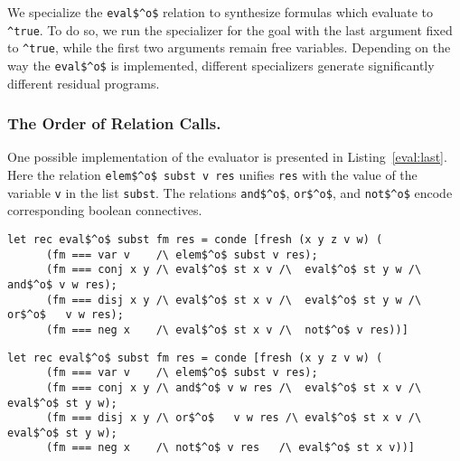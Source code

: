 We specialize the \lstinline{eval$^o$} relation to synthesize formulas which evaluate to \lstinline{^true}.
To do so, we run the specializer for the goal with the last argument fixed to \lstinline{^true}, while the first two arguments remain free variables.
Depending on the way the \lstinline{eval$^o$} is implemented, different specializers generate significantly different residual programs.

\subsubsection{The Order of Relation Calls.}

One possible implementation of the evaluator is presented in Listing~\ref{eval:last}.
Here the relation \lstinline{elem$^o$ subst v res} unifies \lstinline{res} with the value of the variable \lstinline{v} in the list \lstinline{subst}.
The relations \lstinline{and$^o$}, \lstinline{or$^o$}, and \lstinline{not$^o$} encode corresponding boolean connectives.

\begin{figure*}[!t]
  \centering
  \begin{minipage}{0.95\textwidth}
    \begin{lstlisting}[label={eval:last}, caption={Evaluator of formulas with boolean operation last}, captionpos=b, frame=tb]
  let rec eval$^o$ subst fm res = conde [fresh (x y z v w) (
      (fm === var v    /\ elem$^o$ subst v res);
      (fm === conj x y /\ eval$^o$ st x v /\  eval$^o$ st y w /\  and$^o$ v w res);
      (fm === disj x y /\ eval$^o$ st x v /\  eval$^o$ st y w /\  or$^o$   v w res);
      (fm === neg x    /\ eval$^o$ st x v /\  not$^o$ v res))]
    \end{lstlisting}
  \end{minipage}
  \begin{minipage}{0.95\textwidth}
    \begin{lstlisting}[label={eval:fst}, caption={Evaluator of formulas with boolean operation second}, captionpos=b, frame=tb]
  let rec eval$^o$ subst fm res = conde [fresh (x y z v w) (
      (fm === var v    /\ elem$^o$ subst v res);
      (fm === conj x y /\ and$^o$ v w res /\  eval$^o$ st x v /\  eval$^o$ st y w);
      (fm === disj x y /\ or$^o$   v w res /\ eval$^o$ st x v /\  eval$^o$ st y w);
      (fm === neg x    /\ not$^o$ v res   /\ eval$^o$ st x v))]
    \end{lstlisting}
  \end{minipage}
\end{figure*}

